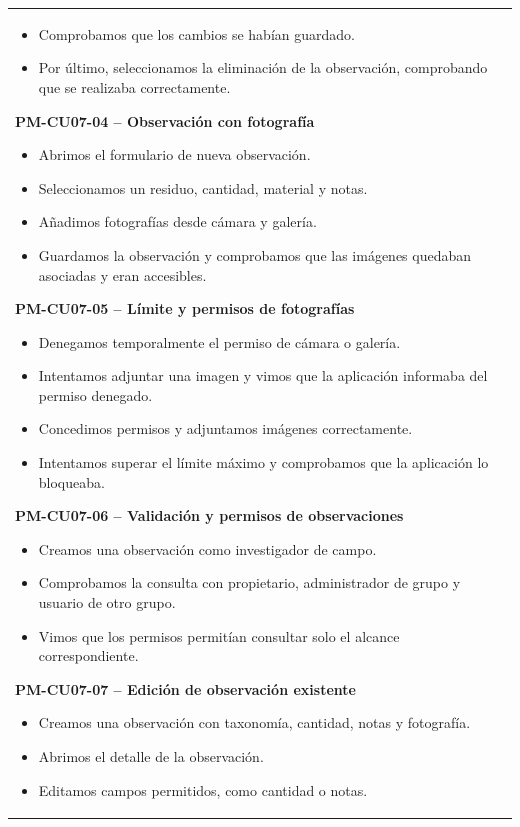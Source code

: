 {\begin{longtable}{|>{\raggedright\arraybackslash}p{4.1cm}|>{\raggedright\arraybackslash}p{10.2cm}|}
\begin{itemize}[leftmargin=1.2em,itemsep=0.15em,topsep=0.2em]
\item Comprobamos que los cambios se habían guardado.
\item Por último, seleccionamos la eliminación de la observación, comprobando que se realizaba correctamente.
\end{itemize}
\textbf{PM-CU07-04 -- Observación con fotografía}
\begin{itemize}[leftmargin=1.2em,itemsep=0.15em,topsep=0.2em]
\item Abrimos el formulario de nueva observación.
\item Seleccionamos un residuo, cantidad, material y notas.
\item Añadimos fotografías desde cámara y galería.
\item Guardamos la observación y comprobamos que las imágenes quedaban asociadas y eran accesibles.
\end{itemize}
\textbf{PM-CU07-05 -- Límite y permisos de fotografías}
\begin{itemize}[leftmargin=1.2em,itemsep=0.15em,topsep=0.2em]
\item Denegamos temporalmente el permiso de cámara o galería.
\item Intentamos adjuntar una imagen y vimos que la aplicación informaba del permiso denegado.
\item Concedimos permisos y adjuntamos imágenes correctamente.
\item Intentamos superar el límite máximo y comprobamos que la aplicación lo bloqueaba.
\end{itemize}
\textbf{PM-CU07-06 -- Validación y permisos de observaciones}
\begin{itemize}[leftmargin=1.2em,itemsep=0.15em,topsep=0.2em]
\item Creamos una observación como investigador de campo.
\item Comprobamos la consulta con propietario, administrador de grupo y usuario de otro grupo.
\item Vimos que los permisos permitían consultar solo el alcance correspondiente.
\end{itemize}
\textbf{PM-CU07-07 -- Edición de observación existente}
\begin{itemize}[leftmargin=1.2em,itemsep=0.15em,topsep=0.2em]
\item Creamos una observación con taxonomía, cantidad, notas y fotografía.
\item Abrimos el detalle de la observación.
\item Editamos campos permitidos, como cantidad o notas.

\end{itemize}
\end{longtable}}
